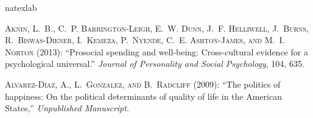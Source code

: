 \documentclass[10pt, letterpaper]{article}
\begin{document}
\begin{spacing}{1.4}







%

\begin{thebibliography}{71}
\newcommand{\enquote}[1]{``#1''}
\expandafter\ifx\csname natexlab\endcsname\relax\def\natexlab#1{#1}\fi

\textsc{Aknin, L.~B., C.~P. Barrington-Leigh, E.~W. Dunn, J.~F. Helliwell,
  J.~Burns, R.~Biswas-Diener, I.~Kemeza, P.~Nyende, C.~E. Ashton-James, and
  M.~I. Norton} (2013): \enquote{Prosocial spending and well-being:
  Cross-cultural evidence for a psychological universal.} \emph{Journal of
  Personality and Social Psychology}, 104, 635.

\textsc{Alvarez-Diaz, A., L.~Gonzalez, and B.~Radcliff} (2009): \enquote{{The
  politics of happiness: On the political determinants of quality of life in
  the American States},} \emph{Unpublished Manuscript}.


\end{thebibliography}
\end{spacing}
\end{document}
